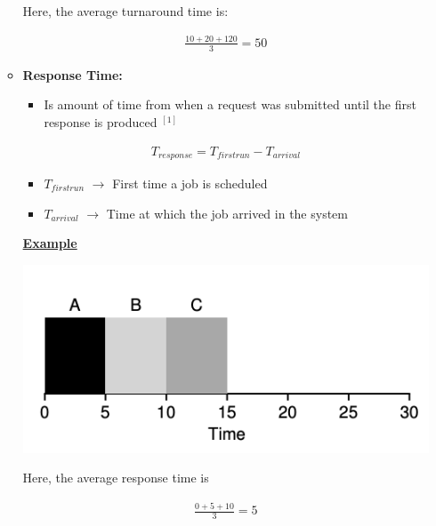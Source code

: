 \documentclass[12pt]{article}
\begin{document}
\begin{enumerate}[1.]
\begin{itemize}
        \bigskip

        Here, the average turnaround time is:

        \begin{align}
            \frac{10 + 20 + 120}{3} = 50
        \end{align}


        \item \textbf{Response Time:}

        \begin{itemize}
            \item Is amount of time from when a request was submitted until the first response is produced $^{[1]}$
        \end{itemize}

        \begin{align}
            T_{response} = T_{firstrun} - T_{arrival}
        \end{align}

        \begin{itemize}
            \item $T_{firstrun}$ $\to$ First time a job is scheduled
            \item $T_{arrival}$ $\to$ Time at which the job arrived in the system
        \end{itemize}

        \bigskip

        \underline{\textbf{Example}}

        \begin{center}
        \includegraphics[width=0.6\linewidth]{images/worksheet_4_solution_3.png}
        \end{center}

        \bigskip

        Here, the average response time is

        \begin{align}
            \frac{0 + 5 + 10}{3} = 5
        \end{align}

    \end{itemize}


\end{enumerate}
\end{document}
